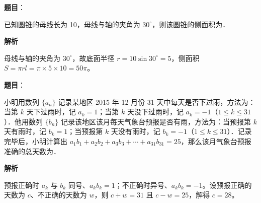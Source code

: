 \begin{answer}

\textbf{题目}：

已知圆锥的母线长为 10，母线与轴的夹角为 \(30^{\circ}\)，则该圆锥的侧面积为\gkblank{}．

\textbf{解析}

母线与轴的夹角为 \(30^{\circ}\)，故底面半径 \(r=10\sin 30^{\circ}=5\)，侧面积 \(S=\pi rl=\pi\times 5\times 10=50\pi\)。


\end{answer}
\begin{answer}

\textbf{题目}：

小明用数列 \(\{a_{n}\}\) 记录某地区 2015 年 12 月份 31 天中每天是否下过雨，方法为：当第 \(k\) 天下过雨时，记 \(a_{k}=1\)；当第 \(k\) 天没下过雨时，记 \(a_{k}=-1\)（\(1\leqslant k\leqslant 31\)）．他用数列 \(\{b_{n}\}\) 记录该地区该月每天气象台预报是否有雨，方法为：当预报第 \(k\) 天有雨时，记 \(b_{k}=1\)；当预报第 \(k\) 天没有雨时，记 \(b_{k}=-1\)（\(1\leqslant k\leqslant 31\)）．记录完毕后，小明计算出 \(a_{1}b_{1}+a_{2}b_{2}+a_{3}b_{3}+\cdots+a_{31}b_{31}=25\)，那么该月气象台预报准确的总天数为\gkblank{}．

\textbf{解析}

预报正确时 \(a_{k}\) 与 \(b_{k}\) 同号、\(a_{k}b_{k}=1\)；不正确时异号、\(a_{k}b_{k}=-1\)。设预报正确的天数为 \(c\)、不正确的天数为 \(w\)，则 \(c+w=31\) 且 \(c-w=25\)，解得 \(c=28\)。


\end{answer}

